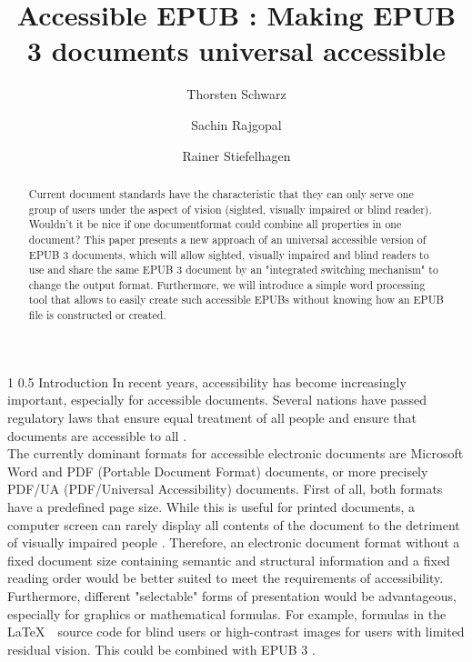 \documentclass{llncs}
\title{Accessible EPUB : Making EPUB 3 documents universal accessible}
\author{Thorsten Schwarz \and Sachin Rajgopal \and Rainer Stiefelhagen}
\institute{Karlsruhe Institute of Technology, Studycentre for the Visually Impaired, Engesserstr. 4, 76131 Karlsruhe, Germany\\
\email{thorsten.schwarz@kit.edu},\\ WWW home page:
\texttt{http://szs.kit.edu}
}
\makeatletter
\renewcommand\section{\@startsection 
   {section}{1}{0mm}%
   {1\baselineskip}%
   {0.5\baselineskip}%
   {\bfseries\Large}%
   }
\makeatother
\begin{document}
\maketitle

\begin{abstract}
Current document standards have the characteristic that they can only serve one group of users under the aspect of vision (sighted, visually impaired or blind reader). Wouldn't it be nice if one documentformat could combine all properties in one document? 
This paper presents a new approach of an universal accessible version of EPUB 3 documents, which will allow sighted, visually impaired and blind readers to use and share the same EPUB 3 document by an "integrated switching mechanism" to change the output format. Furthermore, we will introduce a simple word processing tool that allows to easily create such accessible EPUBs without knowing how an EPUB file is constructed or created. 
\end{abstract}

\section{Introduction}
In recent years, accessibility has become increasingly important, especially for accessible documents. Several nations have passed regulatory laws that ensure equal treatment of all people and ensure that documents are accessible to all \cite{webaim}.\\
The currently dominant formats for accessible electronic documents are Microsoft Word and PDF (Portable Document Format) documents, or more precisely PDF/UA (PDF/Universal Accessibility) documents. First of all, both formats have a predefined page size. While this is useful for printed documents, a computer screen can rarely display all contents of the document to the detriment of visually impaired people \cite{EPUBzone}. Therefore, an electronic document format without a fixed document size containing semantic and structural information and a fixed reading order would be better suited to meet the requirements of accessibility.\\
Furthermore, different "selectable" forms of presentation would be advantageous, especially for graphics or mathematical formulas. For example, formulas in the \LaTeX $\mbox{ }$ source code for blind users or high-contrast images for users with limited residual vision. This could be combined with EPUB 3 \cite{EPUBzone}.
\end{document}
